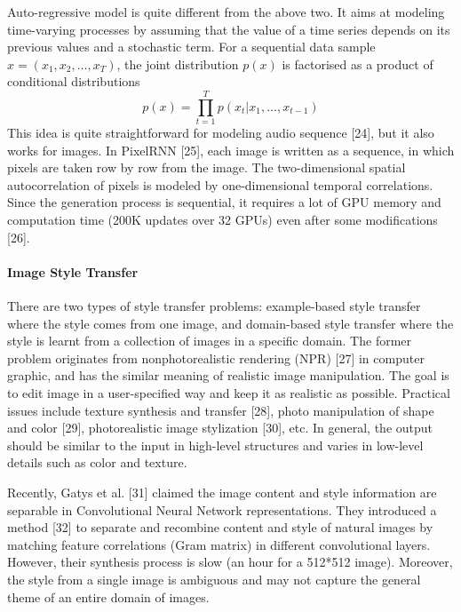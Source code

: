 \documentclass{article}
\begin{document}
Auto-regressive model is quite different from the above two. It aims at modeling time-varying processes by assuming that the value of a time series depends on its previous values and a stochastic term. For a sequential data sample $x = (x_1, x_2, \ldots, x_T)$, the joint distribution $p(x)$ is factorised as a product of conditional distributions
\begin{equation}
p(x) = \prod_{t=1}^{T} p(x_t|x_1, \ldots, x_{t-1})
\end{equation}
This idea is quite straightforward for modeling audio sequence [24], but it also works for images. In PixelRNN [25], each image is written as a sequence, in which pixels are taken row by row from the image. The two-dimensional spatial autocorrelation of pixels is modeled by one-dimensional temporal correlations. Since the generation process is sequential, it requires a lot of GPU memory and computation time (200K updates over 32 GPUs) even after some modifications [26].


\paragraph{Image Style Transfer} %
There are two types of style transfer problems: example-based style transfer where the style comes from one image, and domain-based style transfer where the style is learnt from a collection of images in a specific domain. The former problem originates from nonphotorealistic rendering (NPR) [27] in computer graphic, and has the similar meaning of realistic image manipulation. The goal is to edit image in a user-specified way and keep it as realistic as possible. Practical issues include texture synthesis and transfer [28], photo manipulation of shape and color [29], photorealistic image stylization [30], etc. In general, the output should be similar to the input in high-level structures and varies in low-level details such as color and texture.

Recently, Gatys et al. [31] claimed the image content and style information are separable in Convolutional Neural Network representations. They introduced a method [32] to separate and recombine content and style of natural images by matching feature correlations (Gram matrix) in different convolutional layers. However, their synthesis process is slow (an hour for a 512*512 image). Moreover, the style from a single image is ambiguous and may not capture the general theme of an entire domain of images.
\end{document}

